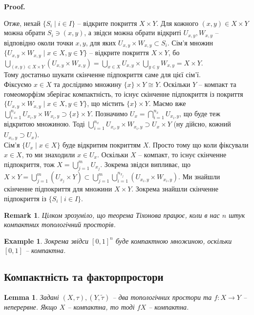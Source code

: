 \documentclass[a4paper, 10pt]{article}
\makeatletter
\theoremstyle{theoremdd}
\newtheorem{example}[theorem]{Example}
\newtheorem{remark}[theorem]{Remark}
\newtheorem{lemma}[theorem]{Lemma}
\renewenvironment{proof}[1][Proof.\\]{\par
\pushQED{\hfill \qed}%
\normalfont \topsep6\p@\@plus6\p@\relax
\trivlist
\item\relax
{\bfseries
#1\@addpunct{.}}\hspace\labelsep\ignorespaces
}{%
\popQED\endtrivlist\@endpefalse
}
\makeatother
\begin{document}
\begin{proof}
Отже, нехай $\{S_i \mid i \in I\}$ -- відкрите покриття $X \times Y$. Для кожного $(x,y) \in X \times Y$ можна обрати $S_i \ni (x,y)$, а звідси можна обрати відкриті $U_{x,y}, W_{x,y}$ -- відповідно околи точки $x,y$, для яких $U_{x,y} \times W_{x,y} \subset S_i$. Сім'я множин $\{U_{x,y} \times W_{x,y} \mid x \in X, y \in Y\}$ -- відкрите покриття $X \times Y$, бо\\
$\displaystyle\bigcup_{(x,y) \in X \times Y} (U_{x,y} \times W_{x,y}) = \bigcup_{x \in X} U_{x,y} \times \bigcup_{y \in y} W_{x,y} = X \times Y$.\\
Тому достатньо шукати скінченне підпокриття саме для цієї сім'ї.\\
Фіксуємо $x \in X$ та дослідимо множину $\{x\} \times Y \cong Y$. Оскільки $Y$ -- компакт та гомеоморфізм зберігає компактність, то існує скінченне підпокриття із покриття $\{U_{x,y} \times W_{x,y} \mid x \in X, y \in Y\}$, що містить $\{x\} \times Y$. Маємо вже $\displaystyle\bigcup_{i=1}^{n_x} U_{x_i,y} \times W_{x_i,y} \supset \{x\} \times Y$. Позначимо $U_x = \displaystyle\bigcap_{i=1}^{n_x} U_{x_i,y}$, що буде теж відкритою множиною. Тоді $\displaystyle\bigcup_{i=1}^{n_x} U_{x_i,y} \times W_{x_i,y} \supset U_x \times Y$ (ну дійсно, кожний $U_{x_i,y} \supset U_x$). \\
Сім'я $\{U_x \mid x \in X\}$ буде відкритим покриттям $X$. Просто тому що коли фіксували $x \in X$, то ми знаходили $x \in U_x$. Оскільки $X$ -- компакт, то існує скінченне підпокриття, тож $X = \displaystyle\bigcup_{j=1}^m U_{x_j}$. Зокрема звідси випливає, що $X \times Y = \displaystyle\bigcup_{j=1}^m (U_{x_j} \times Y) \subset \bigcup_{j=1}^m \bigcup_{i=1}^{n_{x_j}} (U_{x_i,y} \times W_{x_i,y})$. Ми знайшли скінченне підпокриття для множини $X \times Y$. Зокрема знайшли скінченне підпокриття із $\{S_i \mid i \in I\}$.
\end{proof}

\begin{remark}
Цілком зрозуміло, що теорема Тіхонова працює, коли в нас $n$ штук компактних топологічний просторів.
\end{remark}

\begin{example}
Зокрема звідси $[0,1]^n$ буде компактною множиною, оскільки $[0,1]$ -- компактна.
\end{example}

\subsection{Компактність та факторпростори}
\begin{lemma}
Задані $(X,\tau),(Y,\tilde{\tau})$ -- два топологічних простори та $f \colon X \to Y$ -- неперервне. Якщо $X$ -- компактна, то тоді $fX$ -- компактна.
\end{lemma}
\end{document}
